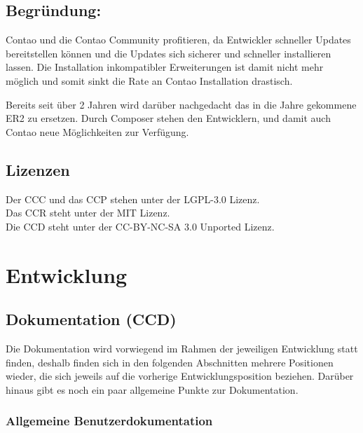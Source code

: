 \documentclass[
paper=a4,
draft=false,%
fontsize=10pt%
]{scrartcl}
\begin{document}
\subsection{Begründung: }

Contao und die Contao Community profitieren, da Entwickler schneller Updates bereitstellen können und die Updates sich sicherer und schneller installieren lassen. Die Installation inkompatibler Erweiterungen ist damit nicht mehr möglich und somit sinkt die Rate an  Contao Installation drastisch.

Bereits seit über 2 Jahren wird darüber nachgedacht das in die Jahre gekommene ER2 zu ersetzen. Durch Composer stehen den Entwicklern, und damit auch Contao neue Möglichkeiten zur Verfügung.

\subsection{Lizenzen}

Der CCC und das CCP stehen unter der LGPL-3.0 Lizenz.\\
Das CCR steht unter der MIT Lizenz. \\
Die CCD steht unter der CC-BY-NC-SA 3.0 Unported Lizenz.

\newpage

%
%

\section{Entwicklung}
\label{sec:development}

\subsection{Dokumentation (CCD)}
\label{subsec:ccd}

Die Dokumentation wird vorwiegend im Rahmen der jeweiligen Entwicklung statt finden, deshalb finden sich in den folgenden Abschnitten mehrere Positionen  wieder, die sich jeweils auf die vorherige Entwicklungsposition beziehen. Darüber hinaus gibt es noch ein paar allgemeine Punkte zur Dokumentation.

\subsubsection{Allgemeine Benutzerdokumentation}
\end{document}
